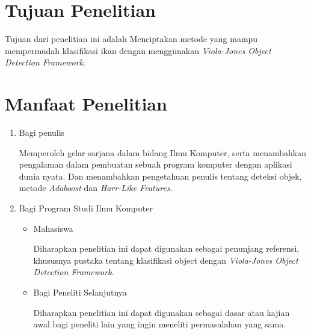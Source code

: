 \section{Tujuan Penelitian}
	Tujuan dari penelitian ini adalah Menciptakan metode yang mampu mempermudah 
	klasifikasi ikan dengan menggunakan \textit{Viola-Jones Object Detection Framework}.

\section{Manfaat Penelitian}
\begin{enumerate}
	\item Bagi penulis
		
	Memperoleh gelar sarjana dalam bidang Ilmu Komputer, serta menambahkan 
	pengalaman dalam pembuatan sebuah program komputer dengan aplikasi dunia 
	nyata. Dan menambahkan pengetahuan penulis tentang deteksi objek, metode 
	\textit{Adaboost} dan \textit{Harr-Like Features}.
		
	\item Bagi Program Studi Ilmu Komputer
	
	\begin{itemize}
		\item Mahasiswa
		
		Diharapkan penelitian ini dapat digunakan sebagai penunjang referensi, 
		khususnya pustaka tentang klasifikasi object dengan 
		\textit{Viola-Jones Object Detection Framework}.

		\item Bagi Peneliti Selanjutnya
		
		Diharapkan penelitian ini dapat digunakan sebagai dasar atau kajian 
		awal bagi peneliti lain yang ingin meneliti permasalahan yang sama.

	\end{itemize}
			
\end{enumerate}

\begin{comment}

\end{comment}
